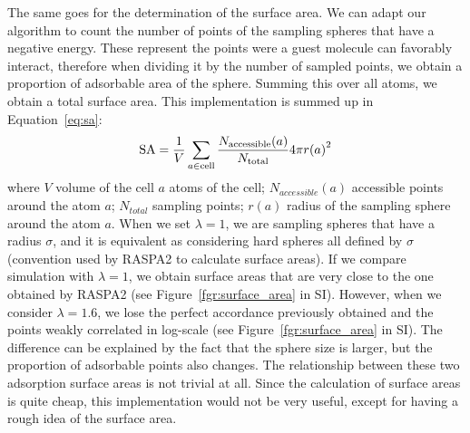 \documentclass[main]{subfiles}
\begin{document}
The same goes for the determination of the surface area. We can adapt our algorithm to count the number of points of the sampling spheres that have a negative energy. These represent the points were a guest molecule can favorably interact, therefore when dividing it by the number of sampled points, we obtain a proportion of adsorbable area of the sphere. Summing this over all atoms, we obtain a total surface area. This implementation is summed up in Equation~\ref{eq:sa}:
\begin{equation}
\label{eq:sa}
    \textrm{SA} = \dfrac{1}{V}\sum_{a\in \textrm{cell}} \dfrac{N_{\text{accessible}}(a)}{N_{\text{total}}}4\pi {r(a)}^2
\end{equation}
where $V$ volume of the cell $a$ atoms of the cell; $N_{accessible}(a)$ accessible points around the atom $a$; $N_{total}$ sampling points; $r(a)$ radius of the sampling sphere around the atom $a$.
When we set $\lambda=1$, we are sampling spheres that have a radius $\sigma$, and it is equivalent as considering hard spheres all defined by $\sigma$ (convention used by RASPA2 to calculate surface areas). If we compare simulation with $\lambda=1$, we obtain surface areas that are very close to the one obtained by RASPA2 (see Figure~\ref{fgr:surface_area} in SI). However, when we consider $\lambda=1.6$, we lose the perfect accordance previously obtained and the points weakly correlated in log-scale (see Figure~\ref{fgr:surface_area} in SI). The difference can be explained by the fact that the sphere size is larger, but the proportion of adsorbable points also changes. The relationship between these two adsorption surface areas is not trivial at all. Since the calculation of surface areas is quite cheap, this implementation would not be very useful, except for having a rough idea of the surface area.
\end{document}
